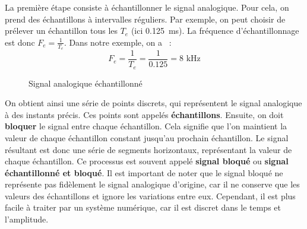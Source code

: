 La première étape consiste à échantillonner le signal analogique. Pour cela, on
prend des échantillons à intervalles réguliers. Par exemple, on peut choisir de
prélever un échantillon tous les \(T_e\) (ici \SI{0.125}{\ms}). La fréquence
d'échantillonnage est donc \(F_e=\frac{1}{T_e}\). Dans notre exemple, on a ~:
\[
    F_e = \frac{1}{T_e} = \frac{1}{0.125} = 8 \text{ kHz}
\]
\begin{figure}[H]
    \centering
    \caption{Signal analogique échantillonné}
    \label{figSignalEchantillonne}
\end{figure}

On obtient ainsi une série de points discrets, qui représentent le signal
analogique à des instants précis. Ces points sont appelés \textbf{échantillons}.
Ensuite, on doit \textbf{bloquer} le signal entre chaque échantillon. Cela signifie
que l'on maintient la valeur de chaque échantillon constant jusqu'au prochain
échantillon. Le signal résultant est donc une série de segments horizontaux,
représentant la valeur de chaque échantillon. Ce processus est souvent appelé
\textbf{signal bloqué} ou \textbf{signal échantillonné et bloqué}. Il est important
de noter que le signal bloqué ne représente pas fidèlement le signal analogique
d'origine, car il ne conserve que les valeurs des échantillons et ignore les
variations entre eux. Cependant, il est plus facile à traiter par un système
numérique, car il est discret dans le temps et l'amplitude.

